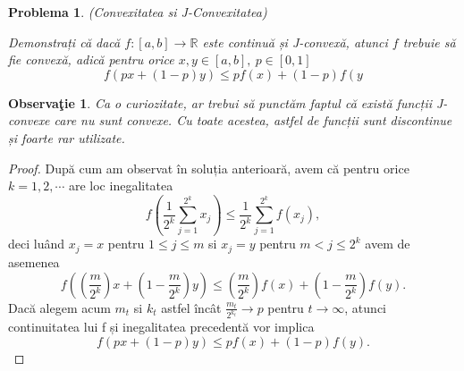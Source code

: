 \documentclass[a4paper,12pt,oneside]{report}
\newtheorem{problem}{Problema}
\newtheorem{remark}{Observa\c{t}ie}
\begin{document}
\begin{problem}  (Convexitatea si J-Convexitatea)

Demonstrați că dacă \(f : \left [ a,b \right ]\rightarrow \mathbb{R} \) este continuă și J-convexă, atunci \(f\) trebuie să fie convexă, adică pentru orice $x, y\in [a,b],~ p\in [0,1]$
\begin{displaymath}
  f\left ( px + \left ( 1 - p \right )y \right )\leq pf\left ( x \right ) + \left ( 1-p \right )f\left ( y \right.
\end{displaymath}
\end{problem}
\begin{remark}
Ca o curiozitate, ar trebui să punctăm faptul că există funcții J-convexe care nu sunt convexe. Cu toate acestea, astfel de funcții sunt discontinue și foarte rar utilizate.
\end{remark}
\begin{proof}
După cum am observat în soluția anterioară, avem că pentru orice \(k = 1,2,\cdots\) are loc inegalitatea
\begin{displaymath}
  f\left ( \frac{1}{2^{k}} \sum_{j = 1}^{2^{k}}x_{j}\right ) \leq  \frac{1}{2^{k}}\sum_{j = 1}^{2^{k}}f\left ( x_{j}\right ),
\end{displaymath}
deci luând \(x_{j} = x\) pentru \(1\leq j\leq m\) si \(x_{j} = y\) pentru \(m< j\leq 2^{k}\) avem de asemenea
\begin{displaymath}
  f\left ( \left ( \frac{m}{2^{k}} \right )x + \left ( 1 - \frac{m}{2^{k}} \right )y \right )\leq \left ( \frac{m}{2^{k}} \right )f\left ( x \right ) + \left ( 1 - \frac{m}{2^{k}} \right )f\left ( y \right ).
\end{displaymath}
Dacă alegem acum \(m_{t}\) si \(k_{t}\) astfel încât \(\frac{m_{t}}{2^{k_{t}}} \rightarrow p\) pentru \(t \rightarrow \infty\), atunci continuitatea lui f și inegalitatea precedentă vor implica
\begin{displaymath}
  f\left ( px + \left ( 1 - p \right )y \right ) \leq  pf\left ( x \right ) + \left ( 1 - p \right )f\left ( y \right ).
\end{displaymath}
\end{proof}
\end{document}
